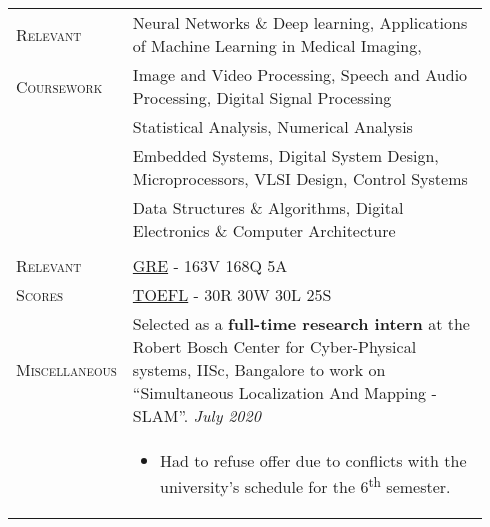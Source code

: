 \documentclass[letterpaper, 10pt, oneside]{article}
\newcommand{\stitle}[1]{\normalsize{\textsc{#1}}}
\begin{document}
\begin{longtable}{@{} p{0.14\linewidth} p{0.8\linewidth}}
    \stitle{Relevant}    & Neural Networks \& Deep learning, Applications of Machine Learning in Medical Imaging,                                                                                                                                   \\
    \stitle{Coursework}  & Image and Video Processing, Speech and Audio Processing, Digital Signal Processing                                                                                                                                       \\
                         & Statistical Analysis, Numerical Analysis                                                                                                                                                                                 \\
                         & Embedded Systems, Digital System Design, Microprocessors, VLSI Design, Control Systems                                                                                                                                   \\
                         & Data Structures \& Algorithms, Digital Electronics \& Computer Architecture                                                                                                                                              \\
    \\[-1ex]

    \stitle{Relevant}
                         & \href{https://drive.google.com/file/d/1GcdXmPTWR-6tKUgB92V8pG8GVn-ng_6C}{GRE} - 163V 168Q 5A
    \\
    \stitle{Scores}      & \href{https://drive.google.com/file/d/1lHDbt59e9o1LFKb_HhWiVbzITH7avB6j}{TOEFL} - 30R 30W 30L 25S
    \\[1ex]


    \stitle{Miscellaneous}
                         & Selected as a \textbf{full-time research intern} at the
    Robert Bosch Center for Cyber-Physical systems, IISc, Bangalore to work on
    ``Simultaneous Localization And Mapping - SLAM''.
    \hfill \textsl{July 2020}                                                                                                                                                                                                                       \\
                         & \parbox{0.8\textwidth}{                                                                                                                                                                                                  %
        \begin{itemize}[leftmargin=6ex, itemsep=-0.88ex, topsep=-0.88ex]
            \item Had to refuse offer due to conflicts with the university's schedule for the 6\textsuperscript{th} semester.
        \end{itemize}
    }
    \\[1.5ex]


\end{longtable}
\end{document}
